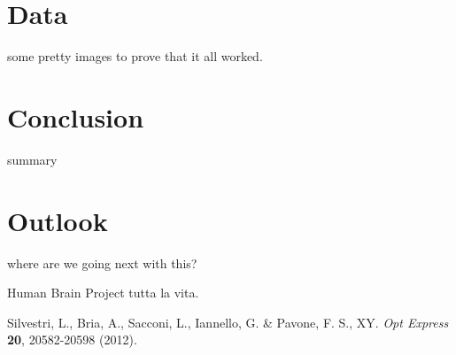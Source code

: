 \documentclass[12pt]{spieman}  %
\begin{document}
\begin{spacing}{2}
\section{Data}
some pretty images to prove that it all worked. 

\section{Conclusion}
summary

\section{Outlook}
where are we going next with this? 

%

\acknowledgments 
Human Brain Project tutta la vita. 


\begin{thebibliography}{0}

 Silvestri, L., Bria, A., Sacconi, L., Iannello, G. \& Pavone, F. S., XY. 	\emph{Opt Express} \textbf{20}, 20582-20598 (2012).

\end{thebibliography}


\listoffigures
\listoftables

\end{spacing}
\end{document}
